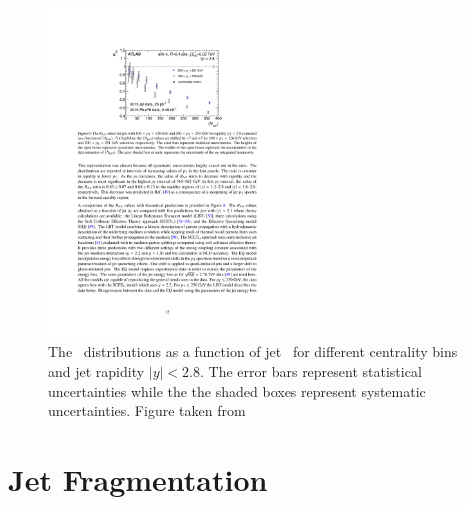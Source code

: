 \begin{figure}[htbp]
\begin{center}
\includegraphics[width=0.55\textwidth]{figures/jetMeasurements/raa_centDep}
\caption{The \RAA\ distributions as a function of jet \pt\ for different centrality bins and jet rapidity $|y| < 2.8$. The error bars represent statistical uncertainties while the the shaded boxes represent systematic uncertainties. Figure taken from \cite{2019108}}
\label{fig:raa_centDep}
\end{center}
\end{figure}














\section{Jet Fragmentation}
\label{sec:jet_ff}
\cite{PhysRevC.98.024908}









